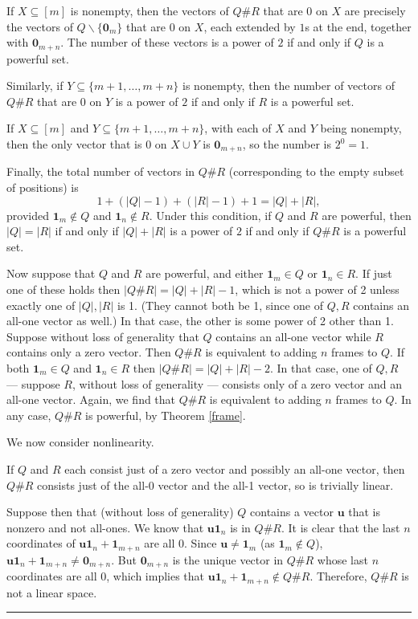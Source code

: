 \documentclass[12pt]{article}
\def\pf{\noindent {\it Proof.\ }}
\def\qed{\hfill \rule{4pt}{7pt}}
\begin{document}
\pf If $X\subseteq[m]$ is nonempty, then the vectors of $Q\#R$ that are $0$ on $X$ are precisely the vectors of $Q\backslash\{\mathbf{0}_m\}$ that are $0$ on $X$, each extended by $1$s at the end, together with $\mathbf{0}_{m+n}$. The number of these vectors is a power of $2$
if and only if $Q$ is a powerful set.

Similarly, if $Y\subseteq\{m+1,\ldots,m+n\}$ is nonempty, then the number of vectors of $Q\#R$ that are $0$ on $Y$ is a power of $2$ if and only if $R$ is a powerful set.

If $X\subseteq[m]$ and $Y\subseteq\{m+1,\ldots,m+n\}$, with each of $X$ and $Y$ being nonempty, then the only vector that is $0$ on $X\cup Y$ is $\mathbf{0}_{m+n}$, so the number is $2^0=1$.

Finally, the total number of vectors in $Q\#R$ (corresponding to the empty subset of positions) is
\[1+(|Q|-1)+(|R|-1)+1=|Q|+|R|,\]
provided $\mathbf{1}_m\not\in Q$ and $\mathbf{1}_n\not\in R$.
Under this condition,
if $Q$ and $R$ are powerful, then $|Q|=|R|$ if and only if
$|Q|+|R|$ is a power of $2$ if and only if $Q\#R$ is a powerful set.

Now suppose that $Q$ and $R$ are powerful, and either
$\mathbf{1}_m\in Q$ or $\mathbf{1}_n\in R$.
If just one of these holds then $|Q\#R|=|Q|+|R|-1$, which is not
a power of 2 unless exactly one of $|Q|,|R|$ is 1.  (They cannot both be 1, since one of $Q,R$
contains an all-one vector as well.)  In that case, the other is some power of 2 other than 1.
Suppose without loss of generality that $Q$ contains an all-one vector while $R$ contains only
a zero vector.  Then $Q\#R$ is equivalent to adding $n$ frames to $Q$.
If both $\mathbf{1}_m\in Q$ and $\mathbf{1}_n\in R$ then $|Q\#R|=|Q|+|R|-2$.  In that case,
one of $Q,R$ --- suppose $R$, without loss of generality ---
consists only of a zero vector and an all-one vector.  Again, we find that
$Q\#R$ is equivalent to adding $n$ frames to $Q$.
In any case, $Q\#R$ is powerful, by Theorem \ref{frame}.

We now consider nonlinearity.

If $Q$ and $R$ each consist just of a zero vector and possibly an
all-one vector, then $Q\#R$ consists just of the all-0 vector and the all-1 vector, so is
trivially linear.


Suppose then that (without loss of generality) $Q$ contains a vector $\mathbf{u}$ that is
nonzero and not all-ones.
We know that $\mathbf{u}\mathbf{1}_n$ is in $Q\#R$. It is clear that the last $n$ coordinates of $\mathbf{u}\mathbf{1}_n+\mathbf{1}_{m+n}$ are all $0$.
Since $\mathbf{u}\not=\mathbf{1}_m$ (as $\mathbf{1}_m\not\in Q$),
$\mathbf{u}\mathbf{1}_n+\mathbf{1}_{m+n}\neq\mathbf{0}_{m+n}$. But $\mathbf{0}_{m+n}$ is the unique vector in $Q\#R$ whose last $n$ coordinates are all $0$, which implies that $\mathbf{u}\mathbf{1}_n+\mathbf{1}_{m+n}\not\in Q\#R$. Therefore, $Q\#R$ is not a linear space.
\qed
\end{document}
